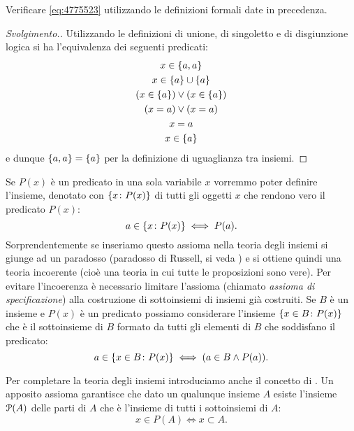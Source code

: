 \begin{exercise}
  Verificare \eqref{eq:4775523} utilizzando le definizioni formali date in precedenza.
\end{exercise}
\begin{proof}[Svolgimento.]
Utilizzando le definizioni di unione, di singoletto e di disgiunzione logica
si ha l'equivalenza dei seguenti
predicati:
\begin{gather*}
  x \in \ENCLOSE{a,a}  \\
  x \in \ENCLOSE{a} \cup \ENCLOSE{a}\\
  (x \in \ENCLOSE{a}) \lor (x \in \ENCLOSE{a})\\
  (x = a) \lor (x = a) \\
  x = a \\
  x \in \ENCLOSE{a}
\end{gather*}
e dunque $\ENCLOSE{a,a}=\ENCLOSE{a}$ per la definizione di uguaglianza tra insiemi.
\end{proof}

Se $P(x)$ è un predicato in una sola variabile $x$ vorremmo poter
definire l'insieme, denotato con $\ENCLOSE{x\colon P(x)}$
di tutti gli oggetti $x$ che rendono vero il predicato $P(x)$:
\[
  a \in \ENCLOSE{x\colon P(x)} \iff P(a).
\]
Sorprendentemente se inseriamo questo assioma nella teoria degli insiemi
si giunge ad un paradosso (paradosso di Russell, si veda \cite{appunti_logica})
e si ottiene quindi una teoria incoerente
(cioè una teoria in cui tutte le proposizioni sono vere). Per evitare
l'incoerenza è necessario limitare l'assioma (chiamato \emph{assioma di specificazione})
alla costruzione di sottoinsiemi di insiemi già costruiti.
Se $B$ è un insieme e $P(x)$ è un predicato possiamo considerare
l'insieme $\ENCLOSE{x\in B\colon P(x)}$ che è il sottoinsieme di
$B$ formato da tutti gli elementi di $B$
che soddisfano il predicato:
\[
  a \in \ENCLOSE{x\in B\colon P(x)} \iff (a \in B \land P(a)).
\]

Per completare la teoria degli insiemi introduciamo anche il concetto di
. Un apposito assioma garantisce
che dato un qualunque insieme $A$ esiste l'insieme $\P(A)$ delle parti di $A$
che è l'insieme di tutti i sottoinsiemi di $A$:
\begin{equation}\label{eq:insieme_delle_parti}
  x \in P(A) \iff x \subset A.
\end{equation}


